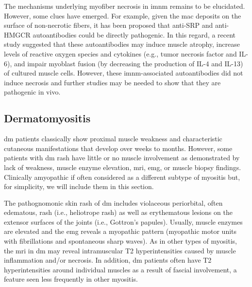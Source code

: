 The mechanisms underlying myofiber necrosis in \gls{imnm} remains to be elucidated. However, some clues have emerged. For example, given the \gls{mac} deposits on the surface of non-necrotic fibers, it has been proposed that anti-SRP and anti-HMGCR autoantibodies could be directly pathogenic.\cite{Allenbach2018} In this regard, a recent study suggested that these autoantibodies may induce muscle atrophy, increase levels of reactive oxygen species and cytokines (e.g., tumor necrosis factor and IL-6), and impair myoblast fusion (by decreasing the production of IL-4 and IL-13) of cultured muscle cells.\cite{AroucheDelaperche2017} However, these \gls{imnm}-associated autoantibodies did not induce necrosis and further studies may be needed to show that they are pathogenic in vivo.\cite{AroucheDelaperche2017}

\subsection{Dermatomyositis}

\gls{dm} patients classically show proximal muscle weakness and characteristic cutaneous manifestations that develop over weeks to months. However, some patients with \gls{dm} rash have little or no muscle involvement as demonstrated by lack of weakness, muscle enzyme elevation, \gls{mri}, \gls{emg}, or muscle biopsy findings. Clinically amyopathic if often considered as a different subtype of myositis\cite{Sontheimer2002} but, for simplicity, we will include them in this section.

The pathognomonic skin rash of \gls{dm} includes violaceous periorbital, often edematous, rash (i.e., heliotrope rash) as well as erythematous lesions on the extensor surfaces of the joints (i.e., Gottron’s papules). Usually, muscle enzymes are elevated and the \gls{emg} reveals a myopathic pattern (myopathic motor units with fibrillations and spontaneous sharp waves). As in other types of myositis, the \gls{mri} in \gls{dm} may reveal intramuscular T2 hyperintensities caused by muscle inflammation and/or necrosis.\cite{PinalFernandez2017} In addition, \gls{dm} patients often have T2 hyperintensities around individual muscles as a result of fascial involvement, a feature seen less frequently in other myositis.\cite{PinalFernandez2017} 

